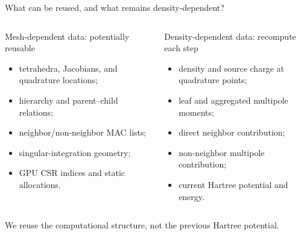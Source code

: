 \documentclass[aspectratio=169,11pt]{beamer}
\begin{document}
\begin{frame}{What can be reused, and what remains density-dependent?}
  \begin{columns}[T,onlytextwidth]
      \begin{block}{Mesh-dependent data: potentially reusable}
        \small
        \begin{itemize}\setlength\itemsep{0.38em}
          \item tetrahedra, Jacobians, and quadrature locations;
          \item hierarchy and parent--child relations;
          \item neighbor/non-neighbor MAC lists;
          \item singular-integration geometry;
          \item GPU CSR indices and static allocations.
        \end{itemize}
      \end{block}
      \begin{block}{Density-dependent data: recompute each step}
        \small
        \begin{itemize}\setlength\itemsep{0.48em}
          \item density and source charge at quadrature points;
          \item leaf and aggregated multipole moments;
          \item direct neighbor contribution;
          \item non-neighbor multipole contribution;
          \item current Hartree potential and energy.
        \end{itemize}
      \end{block}
  \end{columns}

  \vspace{0.25cm}
  \centering\alert{We reuse the computational structure, not the previous Hartree potential.}
\end{frame}
\end{document}
